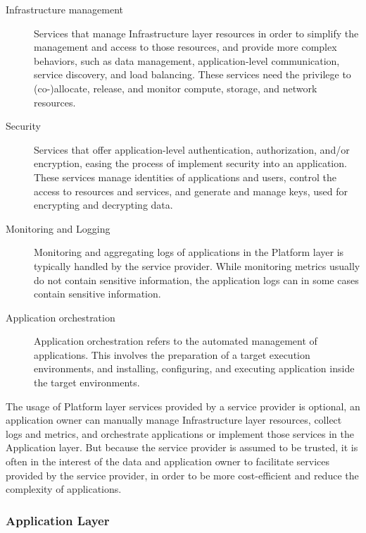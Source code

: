 \begin{description}
  \item[Infrastructure management]
    Services that manage Infrastructure layer resources in order to simplify the
    management and access to those resources, and provide more complex
    behaviors, such as data management, application-level communication, service
    discovery, and load balancing. These services need the privilege to
    (co-)allocate, release, and monitor compute, storage, and network resources.

  \item[Security]
    Services that offer application-level authentication, authorization, and/or
    encryption, easing the process of implement security into an application.
    These services manage identities of applications and users, control the
    access to resources and services, and generate and manage keys, used for
    encrypting and decrypting data.

  \item[Monitoring and Logging]
    Monitoring and aggregating logs of applications in the Platform layer is
    typically handled by the service provider. While monitoring metrics usually
    do not contain sensitive information, the application logs can in some cases
    contain sensitive information.

  \item[Application orchestration]
    Application orchestration refers to the automated management of
    applications. This involves the preparation of a target execution
    environments, and installing, configuring, and executing application inside
    the target environments.
\end{description}

The usage of Platform layer services provided by a service provider is optional,
an application owner can manually manage Infrastructure layer resources, collect
logs and metrics, and orchestrate applications or implement those services in
the Application layer. But because the service provider is assumed to be
trusted, it is often in the interest of the data and application owner to
facilitate services provided by the service provider, in order to be more
cost-efficient and reduce the complexity of applications.

\subsubsection{Application Layer}

